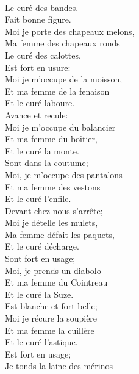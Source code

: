 \\Le curé des bandes. \bissimple
\breakpage
\\
{Fait bonne figure.}
\\Moi je porte des chapeaux melons, \bissimple
\\Ma femme des chapeaux ronds \bissimple
\\Le curé des calottes. \bissimple
\\
{Est fort en usure:}
\\Moi je m'occupe de la moisson, \bissimple
\\Et ma femme de la fenaison \bissimple
\\Et le curé laboure. \bissimple
\\
{Avance et recule:}
\\Moi je m'occupe du balancier \bissimple
\\Et ma femme du boîtier, \bissimple
\\Et le curé la monte. \bissimple
\\
{Sont dans la coutume;}
\\Moi, je m'occupe des pantalons \bissimple
\\Et ma femme des vestons \bissimple
\\Et le curé l'enfile. \bissimple
\\
{Devant chez nous s'arrête;}
\\Moi je dételle les mulets, \bissimple
\\Ma femme défait les paquets, \bissimple
\\Et le curé décharge. \bissimple
\\
{Sont fort en usage;}
\\Moi, je prends un diabolo \bissimple
\\Et ma femme du Cointreau \bissimple
\\Et le curé la Suze. \bissimple
\\
{Est blanche et fort belle;}
\\Moi je récure la soupière \bissimple
\\Et ma femme la cuillère \bissimple
\\Et le curé l'astique. \bissimple
\breakpage
\\
{Est fort en usage;}
\\Je tonds la laine des mérinos \bissimple
